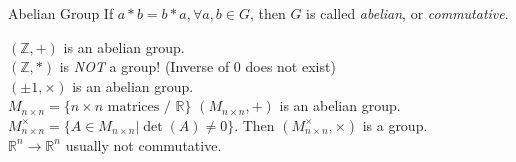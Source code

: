 \begin{Definition}{Abelian Group}{}
  If $a*b = b*a, \forall a, b \in G$, then $G$ is called \emph{abelian}, or \emph{commutative}.
\end{Definition}

\begin{Example}{}{}
  $(\mathbb{Z}, +)$ is an abelian group. \\ 
  $(\mathbb{Z}, *)$ is \emph{NOT} a group! (Inverse of $0$ does not exist) \\
  $({\pm 1}, \times )$ is an abelian group. \\
  $M_{n\times n} = \{n \times n \text{ matrices / } \mathbb{R}\}$ $(M_{n \times n}, + )$ is an abelian group. \\
  $M^{\times }_{n\times n} = \{A \in M_{n\times n} | \operatorname{det}(A) \neq 0\}$. Then $(M^{\times }_{n\times n}, \times )$ is a group. \\
  $\mathbb{R}^{n} \to \mathbb{R}^{n}$ usually not commutative.
\end{Example}

